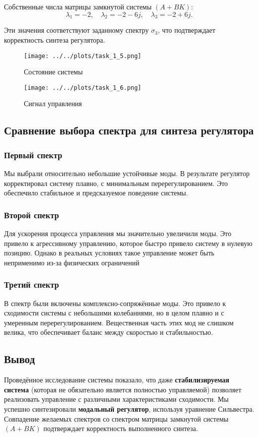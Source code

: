 Собственные числа матрицы замкнутой системы $(A + BK)$:
\[
\lambda_1 = -2, \quad \lambda_2 = -2-6j, \quad \lambda_3 = -2+6j.
\]

Эти значения соответствуют заданному спектру $\sigma_3$, что подтверждает корректность синтеза регулятора.

\begin{figure}[H]
    \centering
    \texttt{[image: ../../plots/task\_1\_5.png]}
    \caption{Состояние системы}
    \label{fig:task_1_state_system_3}
\end{figure}

\begin{figure}[H]
    \centering
    \texttt{[image: ../../plots/task\_1\_6.png]}
    \caption{Сигнал управления}
    \label{fig:task_1_control_signal_3}
\end{figure}


\subsection{Сравнение выбора спектра для синтеза регулятора}

\subsubsection{Первый спектр}
Мы выбрали относительно небольшие устойчивые моды. В результате регулятор корректировал систему плавно, с минимальным перерегулированием. Это обеспечило стабильное и предсказуемое поведение системы.

\subsubsection{Второй спектр}
Для ускорения процесса управления мы значительно увеличили моды. Это привело к агрессивному управлению, которое быстро привело систему в нулевую позицию. Однако в реальных условиях такое управление может быть неприменимо из-за физических ограничений

\subsubsection{Третий спектр}
В спектр были включены комплексно-сопряжённые моды. Это привело к сходимости системы с небольшими колебаниями, но в целом плавно и с умеренным перерегулированием. Вещественная часть этих мод не слишком велика, что обеспечивает баланс между скоростью и стабильностью.


\subsection{Вывод}
Проведённое исследование системы показало, что даже \textbf{стабилизируемая система} (которая не обязательно является полностью управляемой) позволяет реализовать управление с различными характеристиками сходимости. Мы успешно синтезировали \textbf{модальный регулятор}, используя уравнение Сильвестра. Совпадение желаемых спектров со спектром матрицы замкнутой системы $(A + BK)$ подтверждает корректность выполненного синтеза.